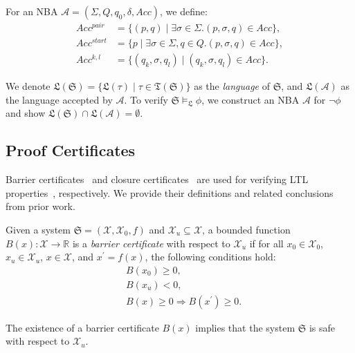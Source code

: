 For an NBA $\mathcal{A} = (\Sigma, Q, q_0, \delta, Acc)$, we define:
\begin{align}
  Acc^{pair} &= \{(p, q) \mid \exists \sigma \in \Sigma. (p, \sigma, q) \in Acc \}, \label{atpair}\\
  Acc^{start} &= \{p \mid \exists \sigma \in \Sigma, q \in Q. (p, \sigma, q) \in Acc \}, \label{atstart}\\
  Acc^{k, l} &= \{(q_k, \sigma, q_l) \mid (q_k, \sigma, q_l) \in Acc \}. \label{atkl}
\end{align}

We denote $\mathfrak{L}(\mathfrak{S}) = \{\mathfrak{L}(\tau) \mid \tau \in \mathfrak{T}(\mathfrak{S})\}$ as the \emph{language} of $\mathfrak{S}$, and $\mathfrak{L}(\mathcal{A})$ as the language accepted by $\mathcal{A}$. To verify $\mathfrak{S} \models_{\mathfrak{L}} \phi$, we construct an NBA $\mathcal{A}$ for $\neg \phi$ and show $\mathfrak{L}(\mathfrak{S}) \cap \mathfrak{L}(\mathcal{A}) = \emptyset$.

\subsection{Proof Certificates}
Barrier certificates~\cite{prajna2004safety} and closure certificates~\cite{murali2024closure} are used for verifying LTL properties~\cite{wongpiromsarn2015automata,murali2024closure}, respectively. We provide their definitions and related conclusions from prior work.

\begin{definition}
  \label{SCDEF}
  Given a system $\mathfrak{S} = (\mathcal{X}, \mathcal{X}_0, f)$ and $\mathcal{X}_{u} \subseteq \mathcal{X}$, a bounded function $B(x): \mathcal{X} \rightarrow \mathbb{R}$ is a \emph{barrier certificate} with respect to $\mathcal{X}_{u}$ if for all $x_0 \in \mathcal{X}_0$, $x_u \in \mathcal{X}_u$, $x \in \mathcal{X}$, and $x^{\prime} = f(x)$, the following conditions hold:
  \begin{align}
    &B(x_0) \geq 0, \label{bsinn0} \\ %
    &B(x_u) < 0, \label{bsun0} \\ %
    &B(x) \geq 0 \Rightarrow B(x^{\prime}) \geq 0. \label{bstnn0} %
  \end{align}
\end{definition}
\begin{theorem}
  \label{corollary_tbsc}
  The existence of a barrier certificate \( B(x) \)  implies that the system $\mathfrak{S}$ is safe with respect to $\mathcal{X}_u$.
\end{theorem}

